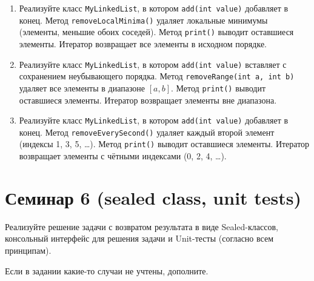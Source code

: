 \documentclass[12pt]{article}
\begin{document}
\begin{enumerate}
\item Реализуйте класс \texttt{MyLinkedList}, в котором \texttt{add(int value)} добавляет в конец. Метод \texttt{removeLocalMinima()} удаляет локальные минимумы (элементы, меньшие обоих соседей). Метод \texttt{print()} выводит оставшиеся элементы. Итератор возвращает все элементы в исходном порядке.

\item Реализуйте класс \texttt{MyLinkedList}, в котором \texttt{add(int value)} вставляет с сохранением неубывающего порядка. Метод \texttt{removeRange(int a, int b)} удаляет все элементы в диапазоне $[a, b]$. Метод \texttt{print()} выводит оставшиеся элементы. Итератор возвращает элементы вне диапазона.

\item Реализуйте класс \texttt{MyLinkedList}, в котором \texttt{add(int value)} добавляет в конец. Метод \texttt{removeEverySecond()} удаляет каждый второй элемент (индексы 1, 3, 5, …). Метод \texttt{print()} выводит оставшиеся элементы. Итератор возвращает элементы с чётными индексами (0, 2, 4, …).
\end{enumerate}

\section{Семинар 6 (sealed class, unit tests)}

Реализуйте решение задачи с возвратом результата в виде Sealed-классов, консольный интерфейс
для решения задачи и Unit-тесты (согласно всем принципам).

Если в задании какие-то случаи не учтены, дополните.
\end{document}
